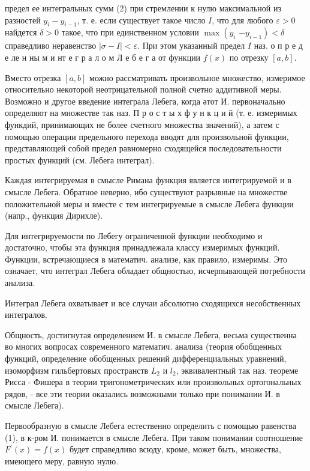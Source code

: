 \documentclass[10pt]{article}
\begin{document}
предел ее интегральных сумм (2) при стремлении к нулю максимальной из разностей $y_{i}-y_{i-1}$, т. е. если существует такое число $I$, что для любого $\varepsilon>0$ найдется $\delta>0$ такое, что при единственном условии $\max \left(y_{i}\right.$ $\left.-y_{i-1}\right)<\delta$ справедливо неравенство $|\sigma-I|<\varepsilon$. При этом указанный предел $I$ наз. о п р е д е ле н ны м и нт е г р а л о м Л е б е г а от функции $f(x)$ по отрезку $[a, b]$.



Вместо отрезка $[a, b]$ можно рассматривать произвольное множество, измеримое относительно некоторой неотрицательной полной счетно аддитивной меры. Возможно и другое введение интеграла Лебега, когда әтот И. первоначально определяют на множестве так наз. П р о с т ы х ф у н к ц и й (т. е. измеримых функдий, принимающих не более счетного множества значений), а затем с помощью операции предельного перехода вводят для произвольной функции, представляющей собой предел равномерно сходящейся последовательности простых функций (см. Лебега интеграл).



Каждая интегрируемая в смысле Римана функция является интегрируемой и в смысле Лебега. Обратное неверно, ибо существуют разрывные на множестве положительной меры и вместе с тем интегрируемые в смысле Лебега функции (напр., функция Дирихле).



Для интегрируемости по Лебегу ограниченной функции необходимо и достаточно, чтобы эта функция принадлежала классу измеримых функций. Функции, встречающиеся в математич. анализе, как правило, измеримы. Это означает, что интеграл Лебега обладает общностью, исчерпывающей потребности анализа.



Интеграл Лебега охватывает и все случаи абсолютно сходящихся несобственных интегралов.



Общность, достигнутая определением И. в смысле Лебега, весьма существенна во многих вопросах современного математич. анализа (теория обобщенных функций, определение обобщенных решений дифференциальных уравнений, изоморфизм гильбертовых пространств $L_{2}$ и $l_{2}$, эквивалентный так наз. теореме Рисса - Фишера в теории тригонометрических или произвольных ортогональных рядов, - все эти теории оказались возможными только при понимании И. в смысле Лебега).



Первообразную в смысле Лебега естественно определить с помощью равенства (1), в к-ром И. понимается в смысле Лебега. При таком понимании соотношение $F^{\prime}(x)=f(x)$ будет справедливо всюду, кроме, может быть, множества, имеющего меру, равную нулю.
\end{document}
